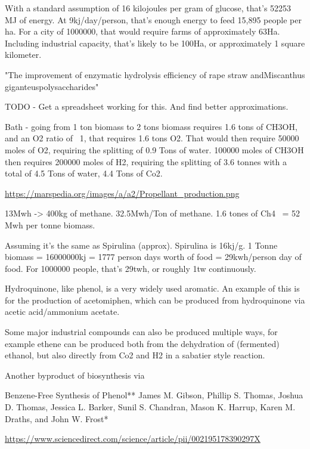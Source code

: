 \documentclass[10pt]{article}
\begin{document}
With a standard assumption of 16 kilojoules per gram of glucose, that's 52253 MJ of energy. At 9kj/day/person, that's enough energy to feed 15,895 people per ha. For a city of 1000000, that would require farms of approximately 63Ha. Including industrial capacity, that's likely to be 100Ha, or approximately 1 square kilometer.

"The improvement of enzymatic hydrolysis efficiency of rape straw andMiscanthus giganteuspolysaccharides"


TODO - Get a spreadsheet working for this. And find better approximations.

Bath - going from 1 ton biomass to 2 tons biomass requires 1.6 tons of CH3OH, and an O2 ratio of ~1, that requires 1.6 tons O2. That would then require 50000 moles of O2, requiring the splitting of 0.9 Tons of water. 100000 moles of CH3OH then requires 200000 moles of H2, requiring the splitting of 3.6 tonnes with a total of 4.5 Tons of water, 4.4 Tons of Co2. 

\url{https://marspedia.org/images/a/a2/Propellant_production.png}

13Mwh -> 400kg of methane. 32.5Mwh/Ton of methane. 1.6 tones of Ch4 ~= 52 Mwh per tonne biomass.

Assuming it's the same as Spirulina (approx). Spirulina is 16kj/g. 1 Tonne biomass = 16000000kj = 1777 person days worth of food = 29kwh/person day of food. For 1000000 people, that's 29twh, or roughly 1tw continuously.








Hydroquinone, like phenol, is a very widely used aromatic. An example of this is for the production of acetomiphen, which can be produced from hydroquinone via acetic acid/ammonium acetate.
 

Some major industrial compounds can also be produced multiple ways, for example ethene can be produced both from the dehydration of (fermented) ethanol, but also directly from Co2 and H2 in a sabatier style reaction. 

Another byproduct of biosynthesis via 

Benzene-Free Synthesis of Phenol**
James M. Gibson, Phillip S. Thomas, Joshua D. Thomas,
Jessica L. Barker, Sunil S. Chandran, Mason K. Harrup,
Karen M. Draths, and John W. Frost*

\url{https://www.sciencedirect.com/science/article/pii/002195178390297X}
\end{document}
